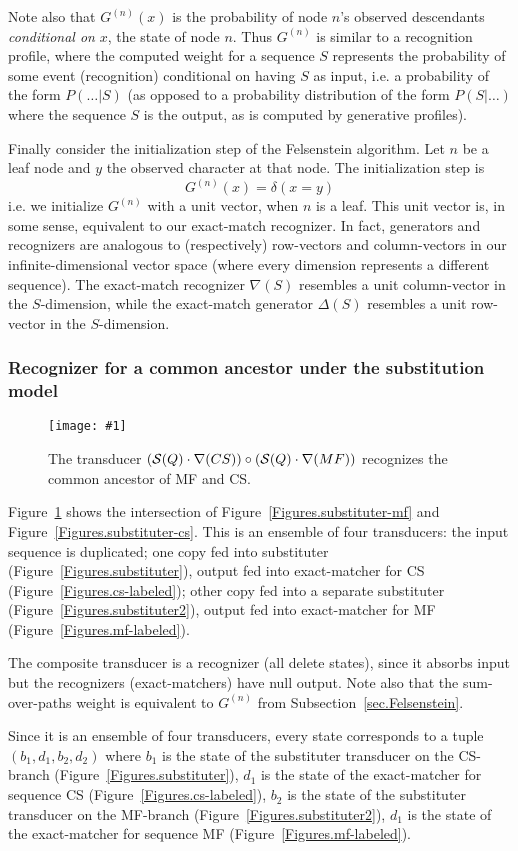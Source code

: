 \documentclass{article}
\newcommand{\secref}[1]{Subsection~\ref{sec.#1}}
\newcommand{\seclabel}[1]{\label{sec.#1}}
\newcommand{\figref}[1]{Figure~\ref{Figures.#1}}
\newcommand{\figlabel}[1]{\label{Figures.#1}}
\newcommand{\easyfig}[4]{
\begin{figure}
\texttt{[image: \#1]}
\caption{ \figlabel{#3} #4}
\end{figure}}
\newcommand{\pdffig}[2]{\easyfig{#1-fig.pdf}{}{#1}{#2}}
\newcommand\substitute{{\cal S}}
\newcommand\fork{\circ}
\newcommand\generate{\Delta}
\newcommand\recognize{\nabla}
\begin{document}
Note also that $G^{(n)}(x)$ is the probability of node $n$'s observed descendants
{\em conditional on} $x$, the state of node $n$.
Thus $G^{(n)}$ is similar to a recognition profile,
where the computed weight for a sequence $S$ represents
the probability of some event (recognition) conditional on having $S$ as input,
i.e. a probability of the form $P(\ldots|S)$
(as opposed to a probability distribution of the form $P(S|\ldots)$ where the sequence $S$ is the output,
as is computed by generative profiles).

Finally consider the initialization step of the Felsenstein algorithm.
Let $n$ be a leaf node and $y$ the observed character at that node.
The initialization step is
\[
G^{(n)}(x) = \delta(x=y)
\]
i.e. we initialize $G^{(n)}$ with a unit vector, when $n$ is a leaf.
This unit vector is, in some sense, equivalent to our exact-match recognizer.
In fact, generators and recognizers are analogous to (respectively) row-vectors and column-vectors
in our infinite-dimensional vector space (where every dimension represents a different sequence).
The exact-match recognizer $\recognize(S)$ resembles a unit column-vector in the $S$-dimension,
while the exact-match generator $\generate(S)$ resembles a unit row-vector in the $S$-dimension.

\subsubsection{Recognizer for a common ancestor under the substitution model}
\seclabel{fork-subcs-submf}

\pdffig{fork-subcs-submf}{The transducer $(\substitute(Q) \cdot \recognize(CS))\fork(\substitute(Q) \cdot \recognize(MF))$  recognizes the common ancestor of MF and CS.}

\figref{fork-subcs-submf} shows the intersection of \figref{substituter-mf} and \figref{substituter-cs}.  
This is an ensemble of four transducers:
the input sequence is duplicated;
one copy fed into substituter (\figref{substituter}),
output fed into exact-matcher for CS (\figref{cs-labeled});
other copy fed into a separate substituter (\figref{substituter2}),
output fed into exact-matcher for MF (\figref{mf-labeled}).

The composite transducer is a recognizer (all delete states), since it absorbs input 
but the recognizers (exact-matchers) have null output.  
Note also that the sum-over-paths weight is equivalent to $G^{(n)}$ from \secref{Felsenstein}.


Since it is an ensemble of four transducers, every state corresponds to a tuple $(b_1,d_1,b_2,d_2)$
where
$b_1$ is the state of the substituter transducer on the CS-branch (\figref{substituter}),
$d_1$ is the state of the exact-matcher for sequence CS (\figref{cs-labeled}),
$b_2$ is the state of the substituter transducer on the MF-branch (\figref{substituter2}),
$d_1$ is the state of the exact-matcher for sequence MF (\figref{mf-labeled}).
\end{document}
